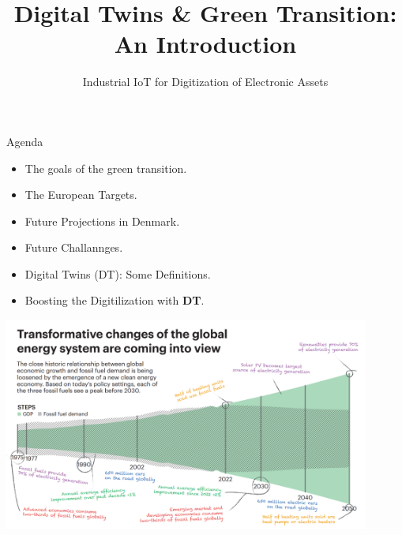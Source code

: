 \documentclass[aspectratio=169,hyperref={pdfpagelabels=false}]{beamer}
\subtitle{\normalsize{Industrial IoT for Digitization of Electronic Assets}}
\title{Digital Twins \& Green Transition: An Introduction}
\begin{document}
\inserttitlepage

\begin{frame}{Agenda}
  \begin{itemize}
    \item The goals of the green transition.
    \item The European Targets.
    \item Future Projections in Denmark.
    \item Future Challannges.
    \item Digital Twins (DT): Some Definitions.
    \item Boosting the Digitilization with \textbf{DT}.
  \end{itemize}
\end{frame}

\begin{frame}{}

  \includegraphics[width=0.9\textwidth]{img/pic0.png} 
  \let\thefootnote\relax{}
    \end{frame}
\end{document}
